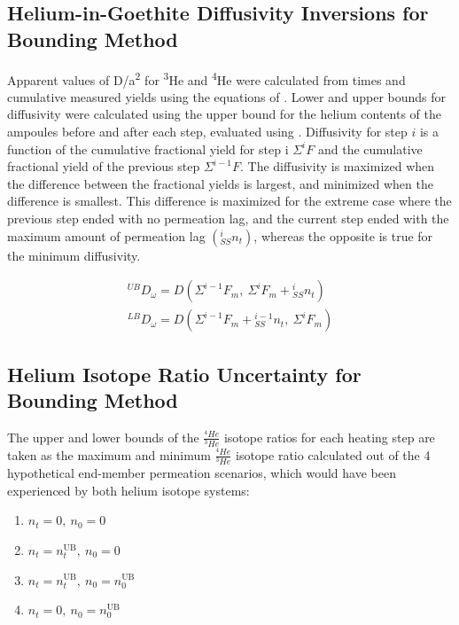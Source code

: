 \subsection{Helium-in-Goethite Diffusivity Inversions for Bounding Method}\label{helium-in-goethite-diffusivity-inversions}

Apparent values of D/a\textsuperscript{2} for \textsuperscript{3}He and \textsuperscript{4}He were
calculated from times and cumulative measured yields using the equations of \citet{fechtigkalbitzer1966}. 
Lower and upper bounds for diffusivity were calculated 
using the upper bound for the helium contents of the 
ampoules before and after each step, evaluated using \MainEqSteadystate. 
Diffusivity for step $i$ is a function of the cumulative fractional yield for step i 
$\Sigma ^{i}F$ and the cumulative fractional yield of the previous step $\Sigma ^{i-1}F$. The diffusivity
is maximized when the difference between the fractional yields is largest, and minimized when the difference is smallest. 
This difference is maximized for the extreme case where the previous step ended with no permeation lag, and the current step ended 
with the maximum amount of permeation lag $\left(_{SS}^{i}n_t\right)$, whereas the opposite is true for the minimum diffusivity. 


\begin{equation}
\label{eq:diffusivity-bounds}
\begin{gathered}
{}^{UB}D_\omega = D\!\left(\Sigma^{i-1}F_m ,~ \Sigma^{i}F_m + {}_{SS}^{i}n_t\right) \\
{}^{LB}D_\omega = D\!\left(\Sigma^{i-1}F_m + {}_{SS}^{i-1}n_t ,~ \Sigma^{i}F_m\right)
\end{gathered}
\end{equation}

\subsection{Helium Isotope Ratio Uncertainty for Bounding Method}\label{helium-isotope-ratio-uncertainty}

The upper and lower bounds of the $\frac{^4He}{^3He}$ isotope ratios for each heating step are taken as the maximum and minimum $\frac{^4He}{^3He}$
isotope ratio calculated out of the 4 hypothetical end-member permeation scenarios, which would have been experienced by both helium isotope systems:

\begin{enumerate}
\item $n_t = 0,\ n_0 = 0$
\item $n_t = n_t^{\mathrm{UB}},\ n_0 = 0$
\item $n_t = n_t^{\mathrm{UB}},\ n_0 = n_0^{\mathrm{UB}}$
\item $n_t = 0,\ n_0 = n_0^{\mathrm{UB}}$
\end{enumerate}

